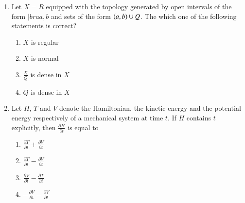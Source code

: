 \documentclass[journal]{IEEEtran}
\begin{document}
\begin{enumerate}
\item Let $X = R$ equipped with the topology generated by open intervals of the form $|bra
a,b$ and sets of the form $\left(a,b\right) \cup Q$. The which one of the following statements is correct?
\begin{multicols}{2}
    \begin{enumerate}
        \item $X$ is regular
        \item $X$ is normal
        \item $\frac{X}{Q}$ is dense in $X$
        \item $Q$ is dense in $X$
    \end{enumerate}
\end{multicols}

\item Let $H$, $T$ and $V$ denote the Hamiltonian, the kinetic energy and the potential energy respectively of a mechanical system at time $t$. If $H$ contains $t$ explicitly, then $\frac{\partial H}{\partial t}$ is equal to
\begin{multicols}{2}
    \begin{enumerate}
        \item $\frac{\partial T}{\partial t} + \frac{\partial V}{\partial t}$
        \item $\frac{\partial T}{\partial t} - \frac{\partial V}{\partial t}$
        \item $\frac{\partial V}{\partial t} - \frac{\partial T}{\partial t}$
        \item $-\frac{\partial V}{\partial t} - \frac{\partial V}{\partial t}$
    \end{enumerate}
\end{multicols}


\end{enumerate}
\end{document}

